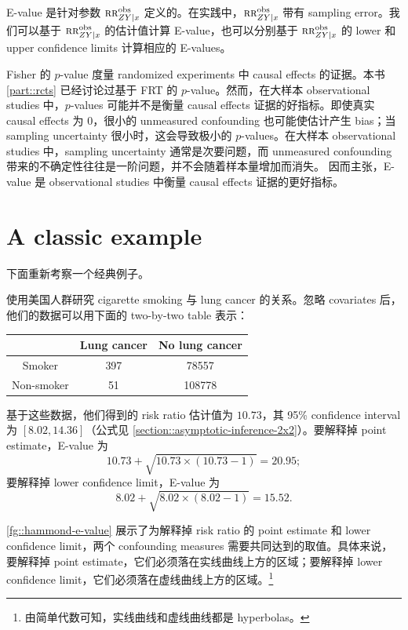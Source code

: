  
 
E-value 是针对参数 $\textsc{rr}_{ZY\mid x}^{\textup{obs}}$ 定义的。在实践中，$\textsc{rr}_{ZY\mid x}^{\textup{obs}}$ 带有 sampling error。我们可以基于 $\textsc{rr}_{ZY\mid x}^{\textup{obs}}$ 的估计值计算 E-value，也可以分别基于 $\textsc{rr}_{ZY\mid x}^{\textup{obs}}$ 的 lower 和 upper confidence limits 计算相应的 E-values。


Fisher 的 $p$-value 度量 randomized experiments 中 causal effects 的证据。本书 \cref{part::rcts} 已经讨论过基于 FRT 的 $p$-value。然而，在大样本 observational studies 中，$p$-values 可能并不是衡量 causal effects 证据的好指标。即使真实 causal effects 为 $0$，很小的 unmeasured confounding 也可能使估计产生 bias；当 sampling uncertainty 很小时，这会导致极小的 $p$-values。在大样本 observational studies 中，sampling uncertainty 通常是次要问题，而 unmeasured confounding 带来的不确定性往往是一阶问题，并不会随着样本量增加而消失。\citet{vanderweele2017sensitivity} 因而主张，E-value 是 observational studies 中衡量 causal effects 证据的更好指标。

 


\section{A classic example}
\label{sec::evalue-example}


下面重新考察一个经典例子。


\begin{example}\label{eg::hammond-evalue}
\citet{Hammond::1968} 使用美国人群研究 cigarette smoking 与 lung cancer 的关系。忽略 covariates 后，他们的数据可以用下面的 two-by-two table 表示：


\begin{center}
\begin{tabular}{ccc}
\hline 
 & Lung cancer & No lung cancer \\
 \hline 
 Smoker & 397 & 78557 \\
 Non-smoker & 51 & 108778  \\ 
 \hline 
\end{tabular}
\end{center} 


基于这些数据，他们得到的 risk ratio 估计值为 $10.73$，其 95\% confidence interval 为 $[8.02, 14.36]$（公式见 \cref{section::asymptotic-inference-2x2}）。要解释掉 point estimate，E-value 为
$$
10.73 + \sqrt{10.73\times (10.73-1)} = 20.95;
$$
要解释掉 lower confidence limit，E-value 为
$$
8.02 +  \sqrt{8.02\times (8.02 - 1)} = 15.52.
$$

\cref{fg::hammond-e-value} 展示了为解释掉 risk ratio 的 point estimate 和 lower confidence limit，两个 confounding measures 需要共同达到的取值。具体来说，要解释掉 point estimate，它们必须落在实线曲线上方的区域；要解释掉 lower confidence limit，它们必须落在虚线曲线上方的区域。\footnote{由简单代数可知，实线曲线和虚线曲线都是 hyperbolas。}
\end{example}


